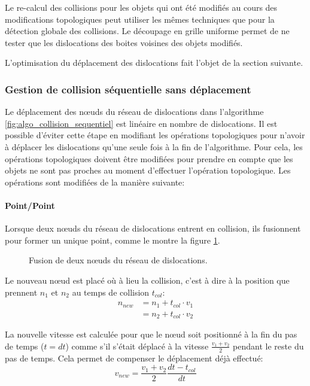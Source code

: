 \documentclass[11pt,class=article,float=false,crop=false]{standalone}
\begin{document}
Le re-calcul des collisions pour les objets qui ont été modifiés au cours des modifications topologiques peut utiliser les mêmes techniques que pour la détection globale des collisions. Le découpage en grille uniforme permet de ne tester que les dislocations des boites voisines des objets modifiés. 

L'optimisation du déplacement des dislocations fait l'objet de la section suivante.

\subsubsection{Gestion de collision séquentielle sans déplacement}
\label{sec:operations_topologiques_nomove}

Le déplacement des nœuds du réseau de dislocations dans l'algorithme \ref{fig:algo_collision_sequentiel} est linéaire en nombre de dislocations. Il est possible d'éviter cette étape en modifiant les opérations topologiques pour n'avoir à déplacer les dislocations qu'une seule fois à la fin de l'algorithme. Pour cela, les opérations topologiques doivent être modifiées pour prendre en compte que les objets ne sont pas proches au moment d'effectuer l'opération topologique. Les opérations sont modifiées de la manière suivante:

\paragraph{Point/Point}

Lorsque deux nœuds du réseau de dislocations entrent en collision, ils fusionnent pour former un unique point, comme le montre la figure \ref{fig:collision_pointpoint}.

\begin{figure}[h]
	\centering
	\caption{Fusion de deux nœuds du réseau de dislocations.}
	\label{fig:collision_pointpoint}
\end{figure}

Le nouveau nœud est placé où à lieu la collision, c'est à dire à la position que prennent $n_1$ et $n_2$ au temps de collision $t_{col}$:
\begin{equation}
\begin{split}
n_{new} & = n_1 + t_{col} \cdot v_1 \\
& = n_2 + t_{col} \cdot v_2
\end{split}
\end{equation}

La nouvelle vitesse est calculée pour que le nœud soit positionné à la fin du pas de temps ($t=dt$) comme s'il s'était déplacé à la vitesse $\frac{v_1+v_2}2$ pendant le reste du pas de temps. Cela permet de compenser le déplacement déjà effectué:
\begin{equation}
v_{new} = \frac{v_1+v_2}2 \frac{dt-t_{col}}{dt}
\end{equation}
\end{document}
